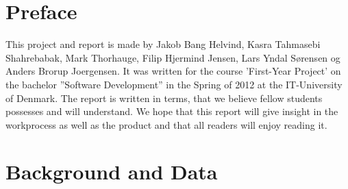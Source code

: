 \documentclass[a4paper,10pt,titlepage]{article}
\begin{document}
	\tableofcontents
	
	\newpage
	\section{Preface}
		This project and report is made by Jakob Bang Helvind, Kasra Tahmasebi Shahrebabak, Mark Thorhauge, Filip Hjermind Jensen, Lars Yndal Sørensen og
		Anders Brorup Joergensen. It was written for the course ’First-Year Project’ on the bachelor ”Software Development” in the Spring of 2012 at the
		IT-University of Denmark. The report is written in terms, that we believe fellow students possesses and will understand. We hope that this 
		report will give insight in the workprocess as well as the product and that all readers will enjoy reading it.
		
	\newpage
	\section{Background and Data}
	
\end{document}
